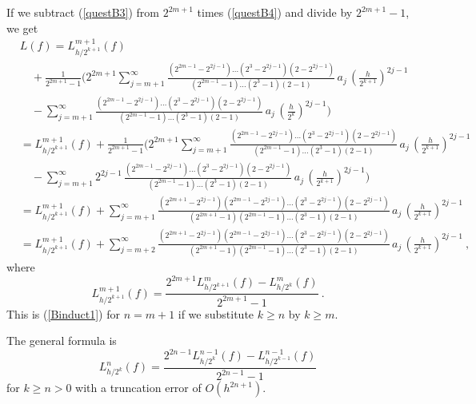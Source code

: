 {If we subtract (\ref{questB3}) from $2^{2m+1}$ times (\ref{questB4})
and divide by $2^{2m+1}-1$, we get
\begin{align*}
&L(f) = L_{h/2^{k+1}}^{m+1}(f) \\
&\quad + \frac{1}{2^{2m+1}-1}
\bigg( 2^{2m+1} \sum_{j=m+1}^\infty
\frac{(2^{2m-1}-2^{2j-1}) \ldots (2^3-2^{2j-1})(2-2^{2j-1})}
{(2^{2m-1}-1)\ldots(2^3-1)(2-1)}\, a_j\, \left(\frac{h}{2^{k+1}}\right)^{2j-1} \\
& \quad -\sum_{j=m+1}^\infty
\frac{(2^{2m-1}-2^{2j-1}) \ldots (2^3-2^{2j-1})(2-2^{2j-1})}
{(2^{2m-1}-1)\ldots(2^3-1)(2-1)}\, a_j\, \left(\frac{h}{2^k}\right)^{2j-1}
\bigg) \\
&= L_{h/2^{k+1}}^{m+1}(f) + \frac{1}{2^{2m+1}-1}
\bigg( 2^{2m+1} \sum_{j=m+1}^\infty
\frac{(2^{2m-1}-2^{2j-1}) \ldots (2^3-2^{2j-1})(2-2^{2j-1})}
{(2^{2m-1}-1)\ldots(2^3-1)(2-1)}\, a_j\, \left(\frac{h}{2^{k+1}}\right)^{2j-1} \\
& \quad -\sum_{j=m+1}^\infty
2^{2j-1} \,\frac{(2^{2m-1}-2^{2j-1}) \ldots (2^3-2^{2j-1})(2-2^{2j-1})}
{(2^{2m-1}-1)\ldots(2^3-1)(2-1)}\, a_j\, \left(\frac{h}{2^{k+1}}\right)^{2j-1}
\bigg) \\
&= L_{h/2^{k+1}}^{m+1}(f) + \sum_{j=m+1}^\infty
\frac{(2^{2m+1} - 2^{2j-1})(2^{2m-1}-2^{2j-1}) \ldots (2^3-2^{2j-1})(2-2^{2j-1})}
{(2^{2m+1}-1)(2^{2m-1}-1)\ldots(2^3-1)(2-1)}\,
a_j\, \left(\frac{h}{2^{k+1}}\right)^{2j-1} \\
&= L_{h/2^{k+1}}^{m+1}(f) + \sum_{j=m+2}^\infty
\frac{(2^{2m+1} - 2^{2j-1})(2^{2m-1}-2^{2j-1}) \ldots (2^3-2^{2j-1})(2-2^{2j-1})}
{(2^{2m+1}-1)(2^{2m-1}-1)\ldots(2^3-1)(2-1)}\,
 a_j\, \left(\frac{h}{2^{k+1}}\right)^{2j-1}\ ,
\end{align*}
where
\[
L_{h/2^{k+1}}^{m+1}(f) = \frac{2^{2m+1}L_{h/2^{k+1}}^m(f)-L_{h/2^k}^m(f)}
{2^{2m+1}-1} \ .
\]
This is (\ref{Binduct1}) for $n=m+1$ if we substitute
$k \geq n$ by $k\geq m$.

The general formula is
\[
L_{h/2^k}^n(f) = \frac{2^{2n-1} L_{h/2^k}^{n-1}(f) -
  L_{h/2^{k-1}}^{n-1}(f)}{2^{2n-1} -1}
\]
for $k \geq n > 0$ with a truncation error of $O(h^{2n+1})$.
}

